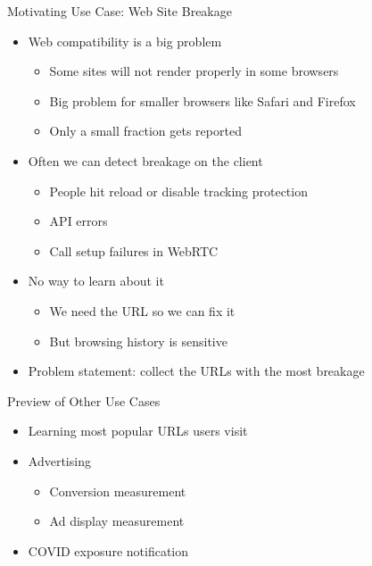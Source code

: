 \documentclass[helvetica]{beamer}
\begin{document}
\begin{frame}{Motivating Use Case: Web Site Breakage}

  \begin{itemize}
  \item Web compatibility is a big problem
    \begin{itemize}
    \item Some sites will not render properly in some browsers
    \item Big problem for smaller browsers like Safari and Firefox
    \item Only a small fraction gets reported      
    \end{itemize}
    
  \item Often we can detect breakage on the client
    \begin{itemize}
    \item People hit reload or disable tracking protection
    \item API errors
    \item Call setup failures in WebRTC
    \end{itemize}

  \item No way to learn about it
    \begin{itemize}
    \item We need the URL so we can fix it
    \item But browsing history is sensitive      
    \end{itemize}

  \item Problem statement: collect the URLs with the most breakage
  \end{itemize}
\end{frame}


\begin{frame}{Preview of Other Use Cases}
  \begin{itemize}
  \item Learning most popular URLs users visit
  \item Advertising
    \begin{itemize}
    \item Conversion measurement
    \item Ad display measurement      
    \end{itemize}
  \item COVID exposure notification
  \end{itemize}
\end{frame}
\end{document}
